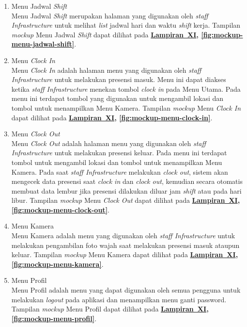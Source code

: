 \begin{enumerate}
    \item Menu Jadwal \textit{Shift}
    \\ Menu Jadwal \textit{Shift} merupakan halaman yang digunakan oleh \textit{staff Infrastructure} untuk melihat \textit{list} jadwal hari dan waktu \textit{shift} kerja. Tampilan \textit{mockup} Menu Jadwal \textit{Shift} dapat dilihat pada \textbf{\hyperref[sec:mockup-aplikasi-presensi-online]{Lampiran~XI}, \ref{fig:mockup-menu-jadwal-shift}}.

    \item Menu \textit{Clock In}
    \\ Menu \textit{Clock In} adalah halaman menu yang digunakan oleh \textit{staff Infrastructure} untuk melakukan presensi masuk. Menu ini dapat diakses ketika \textit{staff Infrastructure} menekan tombol \textit{clock in} pada Menu Utama. Pada menu ini terdapat tombol yang digunakan untuk mengambil lokasi dan tombol untuk menampilkan Menu Kamera. Tampilan \textit{mockup} Menu \textit{Clock In} dapat dilihat pada \textbf{\hyperref[sec:mockup-aplikasi-presensi-online]{Lampiran~XI}, \ref{fig:mockup-menu-clock-in}}.

    \item Menu \textit{Clock Out}
    \\ Menu \textit{Clock Out} adalah halaman menu yang digunakan oleh \textit{staff Infrastructure} untuk melakukan presensi keluar. Pada menu ini terdapat tombol untuk mengambil lokasi dan tombol untuk menampilkan Menu Kamera. Pada saat \textit{staff Infrastructure} melakukan \textit{clock out}, sistem akan mengecek data presensi saat \textit{clock in} dan \textit{clock out}, kemudian secara otomatis membuat data lembur jika presensi dilakukan diluar jam \textit{shift} atau pada hari libur. Tampilan \textit{mockup} Menu \textit{Clock Out} dapat dilihat pada \textbf{\hyperref[sec:mockup-aplikasi-presensi-online]{Lampiran~XI}, \ref{fig:mockup-menu-clock-out}}.

    \item Menu Kamera
    \\ Menu Kamera adalah menu yang digunakan oleh \textit{staff Infrastructure} untuk melakukan pengambilan foto wajah saat melakukan presensi masuk ataupun keluar. Tampilan \textit{mockup} Menu Kamera dapat dilihat pada \textbf{\hyperref[sec:mockup-aplikasi-presensi-online]{Lampiran~XI}, \ref{fig:mockup-menu-kamera}}.

    \item Menu Profil
    \\ Menu Profil adalah menu yang dapat digunakan oleh semua pengguna untuk melakukan \textit{logout} pada aplikasi dan menampilkan menu ganti password. Tampilan \textit{mockup} Menu Profil dapat dilihat pada \textbf{\hyperref[sec:mockup-aplikasi-presensi-online]{Lampiran~XI}, \ref{fig:mockup-menu-profil}}.


\end{enumerate}
